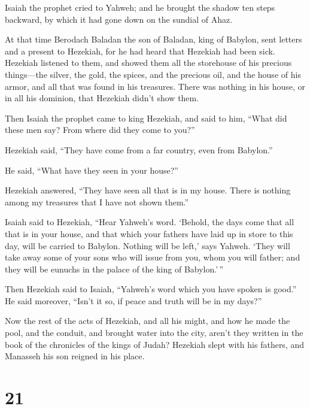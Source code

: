  Isaiah the prophet cried to Yahweh; and he brought the
shadow ten steps backward, by which it had gone down on the sundial of
Ahaz.

 At that time Berodach Baladan the son of Baladan, king
of Babylon, sent letters and a present to Hezekiah, for he had heard
that Hezekiah had been sick.  Hezekiah listened to them,
and showed them all the storehouse of his precious things---the silver,
the gold, the spices, and the precious oil, and the house of his armor,
and all that was found in his treasures. There was nothing in his house,
or in all his dominion, that Hezekiah didn't show them.

 Then Isaiah the prophet came to king Hezekiah, and said
to him, ``What did these men say? From where did they come to you?''

Hezekiah said, ``They have come from a far country, even from Babylon.''

 He said, ``What have they seen in your house?''

Hezekiah answered, ``They have seen all that is in my house. There is
nothing among my treasures that I have not shown them.''

 Isaiah said to Hezekiah, ``Hear Yahweh's word.
 `Behold, the days come that all that is in your house,
and that which your fathers have laid up in store to this day, will be
carried to Babylon. Nothing will be left,' says Yahweh. 
`They will take away some of your sons who will issue from you, whom you
will father; and they will be eunuchs in the palace of the king of
Babylon.'\,''

 Then Hezekiah said to Isaiah, ``Yahweh's word which you
have spoken is good.'' He said moreover, ``Isn't it so, if peace and
truth will be in my days?''

 Now the rest of the acts of Hezekiah, and all his might,
and how he made the pool, and the conduit, and brought water into the
city, aren't they written in the book of the chronicles of the kings of
Judah?  Hezekiah slept with his fathers, and Manasseh his
son reigned in his place.

\hypertarget{section-20}{%
\section{21}\label{section-20}}

